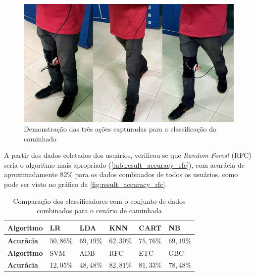 \begin{figure}[ht]
	\caption{\label{fig:result_estados}Demonstração das três ações capturadas para a classificação da caminhada}
	\begin{center}
		\includegraphics[width=.8\textwidth]{resources/result_estados}
	\end{center}
\end{figure}

A partir dos dados coletados dos usuários, verificou-se que \textit{Random Forest} (RFC) seria o algoritmo mais apropriado (\autoref{tab:result_accuracy_rfc}), com acurácia de aproximadamente \(82\%\) para os dados combinados de todos os usuários, como pode ser visto no gráfico da \autoref{fig:result_accuracy_rfc}.

\begin{table}[ht]
	\caption{Comparação dos classificadores com o conjunto de dados combinados para o cenário de caminhada}%
	\label{tab:result_accuracy_rfc}
	\begin{tabularx}{\textwidth}{X X X X X X}
		\toprule
		\textbf{Algoritmo} & LR            & LDA           & KNN           & CART          & NB            \\ \midrule
		\textbf{Acurácia}  & \(50,86\%\)   &   \(69,19\%\)   &   \(62,30\%\)   &   \(75,76\%\)   &   \(69,19\%\) \\ \bottomrule \toprule
		\textbf{Algoritmo} & SVM           & ADB           & RFC           & ETC           & GBC           \\ \midrule
		\textbf{Acurácia}  & \(12,05\%\)   &   \(48,48\%\)   &   \(82,81\%\)   &   \(81,33\%\)   &   \(78,48\%\) \\ \bottomrule
	\end{tabularx}
\end{table}

